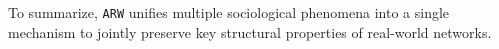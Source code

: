 To summarize, \texttt{ARW} unifies multiple sociological phenomena
into a single mechanism to jointly preserve key structural
properties of real-world networks.




%
%
%


